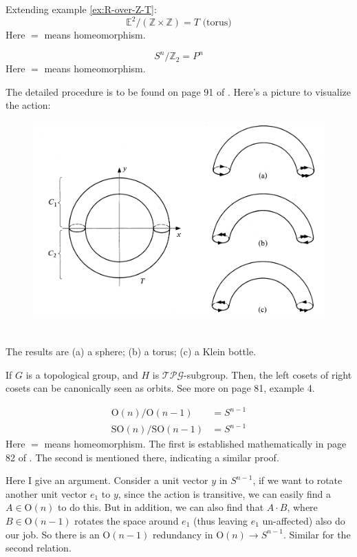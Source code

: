 \begin{ex}
    Extending example \ref{ex:R-over-Z-T}:
\begin{equation}
    \mathbb{E}^2/(\mathbb{Z}\times\mathbb{Z}) = T\text{ (torus)}
\end{equation}
    Here $=$ means homeomorphism.
\end{ex}
\begin{ex}
    \begin{equation}
        S^n/\mathbb{Z}_2 = P^n
    \end{equation}
    Here $=$ means homeomorphism.
\end{ex}
\begin{ex}
    The detailed procedure is to be found on page 91 of \cite{book}.
    Here's a picture to visualize the action:
    \begin{figure}[H]
        \centering
        \includegraphics[width=0.8\linewidth]{pics/3-ways-Z2-on-T.PNG}
        \caption{$ $}
    \end{figure}
    The results are (a) a sphere; (b) a torus; (c) a Klein bottle.
\end{ex}
\begin{ex}
    If $G$ is a topological group, and $H$ is
    $\mathcal{TPG}$-subgroup. Then, the left cosets of right cosets
    can be canonically seen as orbits. See more on page 81, example 4.
\end{ex}
\begin{ex}
\begin{align}
    \mathrm{O}(n)/\mathrm{O}(n-1) &= S^{n-1} \\
    \mathrm{SO}(n)/\mathrm{SO}(n-1) &= S^{n-1}
\end{align}
    Here $=$ means homeomorphism. The first is established
    mathematically in page 82 of \cite{book}. The second is mentioned
    there, indicating a similar proof.

    Here I give an argument. Consider a unit vector $y$ in $S^{n-1}$, if
    we want to rotate another unit vector $e_1$ to $y$, since the
    action is transitive, we can easily find a $A\in \mathrm{O}(n)$ to
    do this. But in addition, we can also find that $A\cdot B$, where
    $B\in \mathrm{O}(n-1)$ rotates the space around $e_1$ (thus
    leaving $e_1$ un-affected) also do our job. So there is an
    $\mathrm{O}(n-1)$ redundancy in $\mathrm{O}(n)\to S^{n-1}$.
    Similar for the second relation.
\end{ex}

